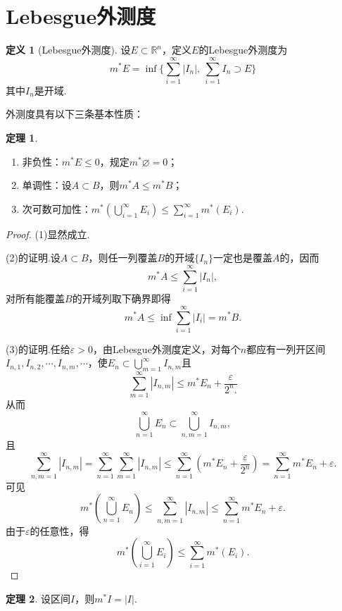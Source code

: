 \documentclass[lang=cn,12pt]{ctexart}
\theoremstyle{definition}
\newtheorem{definition}{定义}
\newtheorem{theorem}{定理}
\theoremstyle{plain}
\begin{document}
\section{Lebesgue外测度}\label{exterior measure}
\begin{definition}[Lebesgue外测度]
	设$E\subset\mathbb{R}^n$，定义$E$的Lebesgue外测度为
	$$m^{*}E=\inf\{\sum_{i=1}^{\infty}|I_n|,\ \sum_{i=1}^{\infty}I_n\supset E\}$$
	其中$I_n$是开域.
\end{definition}
外测度具有以下三条基本性质：
\begin{theorem}
	\begin{enumerate}
		\item 非负性：$m^*E\leqslant 0$，规定$m^*\varnothing=0$；
		\item 单调性：设$A\subset B$，则$m^*A\leqslant m^*B$；
		\item 次可数可加性：$m^*\left(\bigcup\limits_{i=1}^{\infty}E_i\right)\leqslant\sum\limits_{i=1}^{\infty}m^*(E_i)$.
	\end{enumerate}
\end{theorem}
\begin{proof}
	(1)显然成立.
	
	(2)的证明.设$A\subset B$，则任一列覆盖$B$的开域$\{I_n\}$一定也是覆盖$A$的，因而
	$$m^*A\leqslant\sum_{i=1}^{\infty}|I_n|,$$
	对所有能覆盖$B$的开域列取下确界即得
	$$m^*A\leqslant\inf\sum_{i=1}^{\infty}|I_i|=m^*B.$$
	
	(3)的证明.任给$\varepsilon>0$，由Lebesgue外测度定义，对每个$n$都应有一列开区间$I_{n,1},I_{n,2},\cdots,I_{n,m},\cdots$，使$E_n\subset\bigcup\limits_{m=1}^{\infty}I_{n,m}$且
	$$\sum_{m=1}^{\infty}|I_{n,m}|\leqslant m^*E_n+\frac{\varepsilon}{2^n.}$$
	从而
	$$\bigcup_{n=1}^{\infty}E_n\subset\bigcup_{n,m=1}^{\infty}I_{n,m},$$
	且
	$$\sum_{n,m=1}^{\infty}|I_{n,m}|=\sum_{n=1}^{\infty}\sum_{m=1}^{\infty}|I_{n,m}|\leqslant\sum_{n=1}^{\infty}\left(m^*E_n+\frac{\varepsilon}{2^n}\right)=\sum_{n=1}^{\infty}m^*E_n+\varepsilon.$$
	可见
	$$m^*\left(\bigcup_{n=1}^{\infty}E_n\right)\leqslant\sum_{n,m=1}^{\infty}|I_{n,m}|\leqslant\sum_{n=1}^{\infty}m^*E_n+\varepsilon.$$
	由于$\varepsilon$的任意性，得
	$$m^*\left(\bigcup\limits_{i=1}^{\infty}E_i\right)\leqslant\sum\limits_{i=1}^{\infty}m^*(E_i).$$
	
\end{proof}
\begin{theorem}
	设区间$I$，则$m^*I=|I|$.
\end{theorem}
\end{document}
